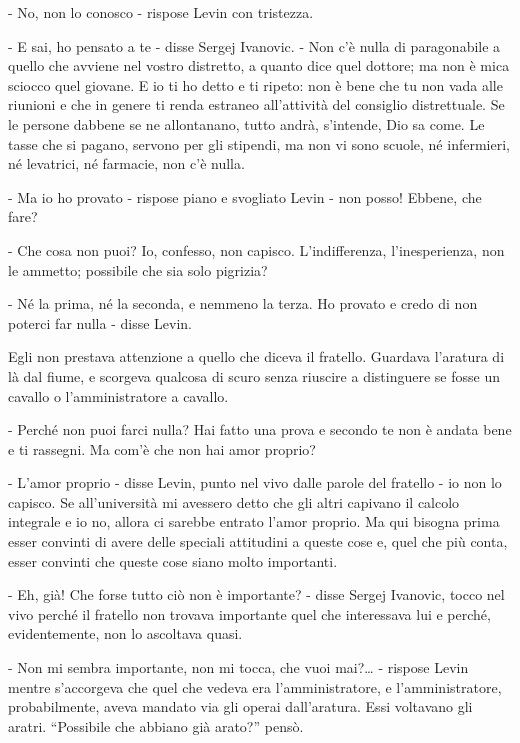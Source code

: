 - No, non lo conosco - rispose Levin con tristezza. 

\label{iii-2} 

- E sai, ho pensato a te - disse Sergej Ivanovic. - Non c'è nulla di paragonabile a quello che avviene nel vostro distretto, a quanto dice quel dottore; ma non è mica sciocco quel giovane. E io ti ho detto e ti ripeto: non è bene che tu non vada alle riunioni e che in genere ti renda estraneo all'attività del consiglio distrettuale. Se le persone dabbene se ne allontanano, tutto andrà, s'intende, Dio sa come. Le tasse che si pagano, servono per gli stipendi, ma non vi sono scuole, né infermieri, né levatrici, né farmacie, non c'è nulla. 

- Ma io ho provato - rispose piano e svogliato Levin - non posso! Ebbene, che fare? 

- Che cosa non puoi? Io, confesso, non capisco. L'indifferenza, l'inesperienza, non le ammetto; possibile che sia solo pigrizia? 

- Né la prima, né la seconda, e nemmeno la terza. Ho provato e credo di non poterci far nulla - disse Levin. 

Egli non prestava attenzione a quello che diceva il fratello. Guardava l'aratura di là dal fiume, e scorgeva qualcosa di scuro senza riuscire a distinguere se fosse un cavallo o l'amministratore a cavallo. 

- Perché non puoi farci nulla? Hai fatto una prova e secondo te non è andata bene e ti rassegni. Ma com'è che non hai amor proprio? 

- L'amor proprio - disse Levin, punto nel vivo dalle parole del fratello - io non lo capisco. Se all'università mi avessero detto che gli altri capivano il calcolo integrale e io no, allora ci sarebbe entrato l'amor proprio. Ma qui bisogna prima esser convinti di avere delle speciali attitudini a queste cose e, quel che più conta, esser convinti che queste cose siano molto importanti. 

- Eh, già! Che forse tutto ciò non è importante? - disse Sergej Ivanovic, tocco nel vivo perché il fratello non trovava importante quel che interessava lui e perché, evidentemente, non lo ascoltava quasi. 

- Non mi sembra importante, non mi tocca, che vuoi mai?\ldots{} - rispose Levin mentre s'accorgeva che quel che vedeva era l'amministratore, e l'amministratore, probabilmente, aveva mandato via gli operai dall'aratura. Essi voltavano gli aratri. ``Possibile che abbiano già arato?'' pensò. 

